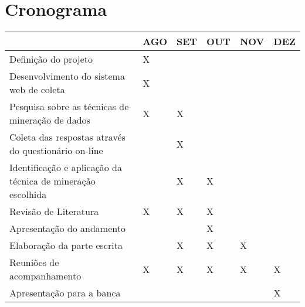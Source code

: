 \documentclass[projtg]{mdtufsm}
\begin{document}
\chapter{Cronograma}
\begin{tabu} to 0.9\linewidth{|X[6]|X|X|X|X|X|}
	\hline
	& AGO & SET & OUT & NOV & DEZ \\
	\hline
	Definição do projeto & X & & & & \\
	\hline
	Desenvolvimento do sistema web de coleta & X & & & & \\
	\hline
	Pesquisa sobre as técnicas de mineração de dados & X & X & & & \\
	\hline
	Coleta das respostas através do questionário on-line & & X & & & \\
	\hline
	Identificação e aplicação da técnica de mineração escolhida & & X & X & & \\
	\hline
	Revisão de Literatura & X & X & X & & \\
	\hline
	Apresentação do andamento & & & X & & \\
	\hline
	Elaboração da parte escrita & & X & X & X & \\
	\hline
	Reuniões de acompanhamento & X & X & X & X & X \\
	\hline
	Apresentação para a banca & & & & & X \\
	\hline
\end{tabu}
 
\setlength{\baselineskip}{\baselineskip}



\end{document}
